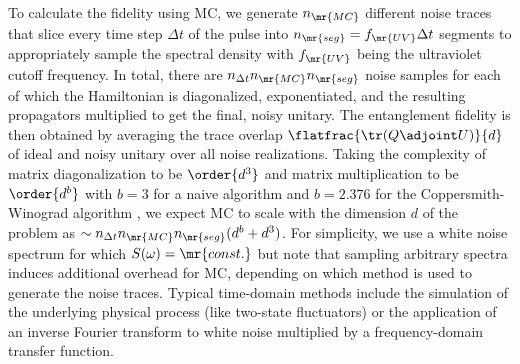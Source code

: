 To calculate the fidelity using MC, we generate $n_\mr{MC}$ different noise traces that slice every time step $\Delta t$ of the pulse into $n_\mr{seg} = f_\mr{UV}\Delta t$ segments to appropriately sample the spectral density with $f_{\mr{UV}}$ being the ultraviolet cutoff frequency. In total, there are $n_{\Delta t} n_\mr{MC} n_\mr{seg}$ noise samples for each of which the Hamiltonian is diagonalized, exponentiated, and the resulting propagators multiplied to get the final, noisy unitary. The entanglement fidelity is then obtained by averaging the trace overlap $\flatfrac{\tr(Q\adjoint U)}{d}$ of ideal and noisy unitary over all noise realizations. Taking the complexity of matrix diagonalization to be $\order{d^3}$ and matrix multiplication to be $\order{d^b}$ with $b = 3$ for a naive algorithm and $b = \num{2.376}$ for the Coppersmith-Winograd algorithm \cite{Coppersmith1990}, we expect MC to scale with the dimension $d$ of the problem as $\sim n_{\Delta t} n_\mr{MC} n_\mr{seg} (d^b + d^3)$. For simplicity, we use a white noise spectrum for which $S(\omega) = \mr{const.}$ but note that sampling arbitrary spectra induces additional overhead for MC, depending on which method is used to generate the noise traces. Typical time-domain methods include the simulation of the underlying physical process (like two-state fluctuators) or the application of an inverse Fourier transform to white noise multiplied by a frequency-domain transfer function.

